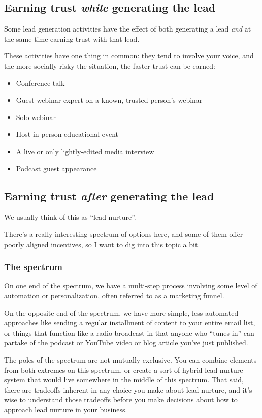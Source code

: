 \subsection{Earning trust \emph{while} generating the lead}

Some lead generation activities have the effect of both generating a lead \emph{and} at the same time earning trust with that lead.

These activities have one thing in common: they tend to involve your voice, and the more socially risky the situation, the faster trust can be earned:

\begin{itemize}
\item Conference talk
\item Guest webinar expert on a known, trusted person's webinar
\item Solo webinar
\item Host in-person educational event
\item A live or only lightly-edited media interview
\item Podcast guest appearance
\end{itemize}

\subsection{Earning trust \emph{after} generating the lead}

We usually think of this as ``lead nurture''.

There's a really interesting spectrum of options here, and some of them offer poorly aligned incentives, so I want to dig into this topic a bit.

\subsubsection{The spectrum}

On one end of the spectrum, we have a multi-step process involving some level of automation or personalization, often referred to as a marketing funnel.

On the opposite end of the spectrum, we have more simple, less automated approaches like sending a regular installment of content to your entire email list, or things that function like a radio broadcast in that anyone who ``tunes in'' can partake of the podcast or YouTube video or blog article you've just published.

The poles of the spectrum are not mutually exclusive. You can combine elements from both extremes on this spectrum, or create a sort of hybrid lead nurture system that would live somewhere in the middle of this spectrum. That said, there are tradeoffs inherent in any choice you make about lead nurture, and it's wise to understand those tradeoffs before you make decisions about how to approach lead nurture in your business.

